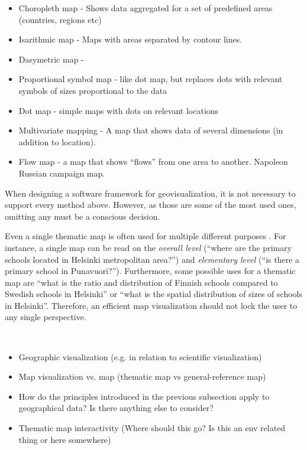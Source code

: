 \begin{itemize}
	\item Choropleth map - Shows data aggregated for a set of predefined areas (countries, regions etc)
	\item Isarithmic map - Maps with areas separated by contour lines.
	\item Dasymetric map - 
	\item Proportional symbol map - like dot map, but replaces dots with relevant symbols of sizes proportional to the data
	\item Dot map - simple maps with dots on relevant locations
	\item Multivariate mapping - A map that shows data of several dimensions (in addition to location).
	\item Flow map - a map that shows ``flows'' from one area to another. Napoleon Russian campaign map.
\end{itemize}

When designing a software framework for geovisualization, it is not necessary to support every method above. However, as those are some of the most used ones, omitting any must be a conscious decision.


Even a single thematic map is often used for multiple different purposes \citep[chap.~2]{schlichtmann_visualization_2002}. For instance, a single map can be read on the \emph{overall level} (``where are the primary schools located in Helsinki metropolitan area?'') and \emph{elementary level} (``is there a primary school in Punavuori?''). Furthermore, some possible uses for a thematic map are ``what is the ratio and distribution of Finnish schools compared to Swedish schools in Helsinki'' or ``what is the spatial distribution of sizes of schools in Helsinki''. Therefore, an efficient map visualization should not lock the user to any single perspective.  


~

\begin{itemize}
	\item Geographic visualization (e.g. in relation to scientific visualization)
	\item Map visualization vs. map (thematic map vs general-reference map) \citep{bartz_petchenik_place_1979}
	\item How do the principles introduced in the previous subsection apply to geographical data? Is there anything else to consider?
	\item Thematic map interactivity \citep{andrienko_interactive_1999} (Where should this go? Is this an env related thing or here somewhere)
\end{itemize}

